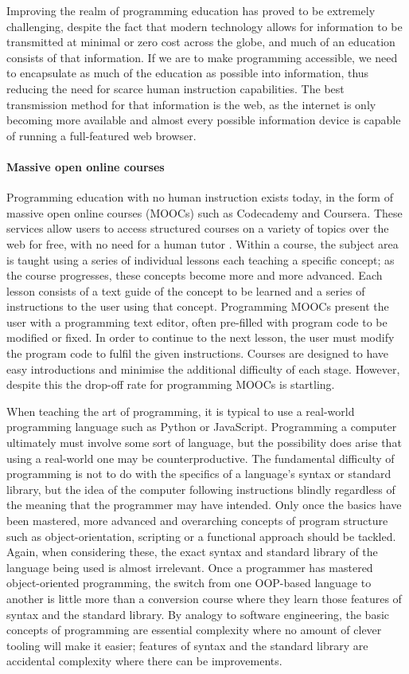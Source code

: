 Improving the realm of programming education has proved to be extremely challenging, despite the fact that modern technology allows for information to be transmitted at minimal or zero cost across the globe, and much of an education consists of that information. If we are to make programming accessible, we need to encapsulate as much of the education as possible into information, thus reducing the need for scarce human instruction capabilities. The best transmission method for that information is the web, as the internet is only becoming more available and almost every possible information device is capable of running a full-featured web browser.

\paragraph{Massive open online courses}
Programming education with no human instruction exists today, in the form of massive open online courses (MOOCs) such as Codecademy and Coursera. These services allow users to access structured courses on a variety of topics over the web for free, with no need for a human tutor \cite{alex229475}. Within a course, the subject area is taught using a series of individual lessons each teaching a specific concept; as the course progresses, these concepts become more and more advanced. Each lesson consists of a text guide of the concept to be learned and a series of instructions to the user using that concept. Programming MOOCs present the user with a programming text editor, often pre-filled with program code to be modified or fixed. In order to continue to the next lesson, the user must modify the program code to fulfil the given instructions. Courses are designed to have easy introductions and minimise the additional difficulty of each stage. However, despite this the drop-off rate for programming MOOCs is startling.

When teaching the art of programming, it is typical to use a real-world programming language such as Python or JavaScript. Programming a computer ultimately must involve some sort of language, but the possibility does arise that using a real-world one may be counterproductive. The fundamental difficulty of programming is not to do with the specifics of a language's syntax or standard library, but the idea of the computer following instructions blindly regardless of the meaning that the programmer may have intended. Only once the basics have been mastered, more advanced and overarching concepts of program structure such as object-orientation, scripting or a functional approach should be tackled. Again, when considering these, the exact syntax and standard library of the language being used is almost irrelevant. Once a programmer has mastered object-oriented programming, the switch from one OOP-based language to another is little more than a conversion course where they learn those features of syntax and the standard library. By analogy to software engineering, the basic concepts of programming are essential complexity where no amount of clever tooling will make it easier; features of syntax and the standard library are accidental complexity where there can be improvements.

